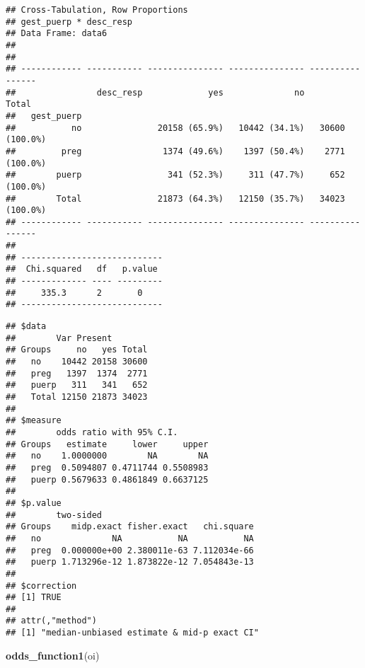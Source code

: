 \documentclass[
]{article}
\newenvironment{Shaded}{\begin{snugshade}}{\end{snugshade}}
\newcommand{\KeywordTok}[1]{\textcolor[rgb]{0.13,0.29,0.53}{\textbf{#1}}}
\newcommand{\NormalTok}[1]{#1}
\newcommand{\OperatorTok}[1]{\textcolor[rgb]{0.81,0.36,0.00}{\textbf{#1}}}
\newcommand{\StringTok}[1]{\textcolor[rgb]{0.31,0.60,0.02}{#1}}
\begin{document}
\begin{verbatim}
## Cross-Tabulation, Row Proportions  
## gest_puerp * desc_resp  
## Data Frame: data6  
## 
## 
## ------------ ----------- --------------- --------------- ----------------
##                desc_resp             yes              no            Total
##   gest_puerp                                                             
##           no               20158 (65.9%)   10442 (34.1%)   30600 (100.0%)
##         preg                1374 (49.6%)    1397 (50.4%)    2771 (100.0%)
##        puerp                 341 (52.3%)     311 (47.7%)     652 (100.0%)
##        Total               21873 (64.3%)   12150 (35.7%)   34023 (100.0%)
## ------------ ----------- --------------- --------------- ----------------
## 
## ----------------------------
##  Chi.squared   df   p.value 
## ------------- ---- ---------
##     335.3      2       0    
## ----------------------------
\end{verbatim}

\begin{Shaded}
\end{Shaded}

\begin{verbatim}
## $data
##        Var Present
## Groups     no   yes Total
##   no    10442 20158 30600
##   preg   1397  1374  2771
##   puerp   311   341   652
##   Total 12150 21873 34023
## 
## $measure
##        odds ratio with 95% C.I.
## Groups   estimate     lower     upper
##   no    1.0000000        NA        NA
##   preg  0.5094807 0.4711744 0.5508983
##   puerp 0.5679633 0.4861849 0.6637125
## 
## $p.value
##        two-sided
## Groups    midp.exact fisher.exact   chi.square
##   no              NA           NA           NA
##   preg  0.000000e+00 2.380011e-63 7.112034e-66
##   puerp 1.713296e-12 1.873822e-12 7.054843e-13
## 
## $correction
## [1] TRUE
## 
## attr(,"method")
## [1] "median-unbiased estimate & mid-p exact CI"
\end{verbatim}

\begin{Shaded}
\begin{Highlighting}[]
\KeywordTok{odds_function1}\NormalTok{(oi)}
\end{Highlighting}
\end{Shaded}
\end{document}

